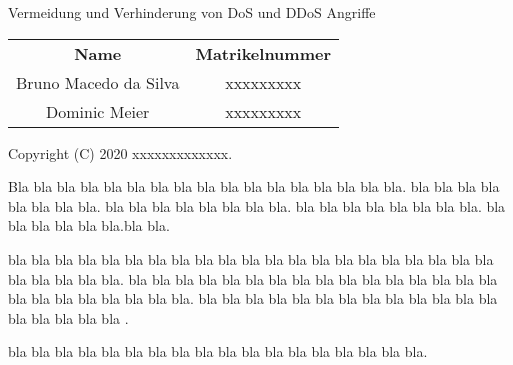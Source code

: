 \begin{titlepage}
    \vspace*{7cm}
    \begin{center}
        \Huge
        Vermeidung und Verhinderung von DoS und DDoS Angriffe\\
        \vspace{1cm}
        \large
        \vspace{2cm}
         \begin {table}[ht]
             \centering
             \begin{tabular}{c|c}
                 \textbf{Name} & \textbf{Matrikelnummer} \\
                 Bruno Macedo da Silva & xxxxxxxxx \\
                 Dominic Meier         & xxxxxxxxx \\
             \end{tabular}
         \end {table}
    \end{center}
    \normalsize
    \vfill
    Copyright (C) 2020 xxxxxxxxxxxxx.

    Bla bla bla bla bla bla bla bla bla bla bla bla bla bla bla bla bla. bla bla bla bla bla bla bla bla. 
    bla bla bla bla bla bla bla bla. bla bla bla bla bla bla bla bla. bla bla bla bla bla bla.bla bla.

    bla bla bla bla bla bla bla bla bla bla bla bla bla bla bla bla bla bla bla bla bla bla bla bla bla bla.
    bla bla bla bla bla bla bla bla bla bla bla bla bla bla bla bla bla bla bla bla bla bla bla bla.
    bla bla bla bla bla bla bla bla bla bla bla bla bla bla bla bla bla bla .


    bla bla bla bla bla bla bla bla bla bla bla bla bla bla bla bla bla bla.


\end{titlepage}